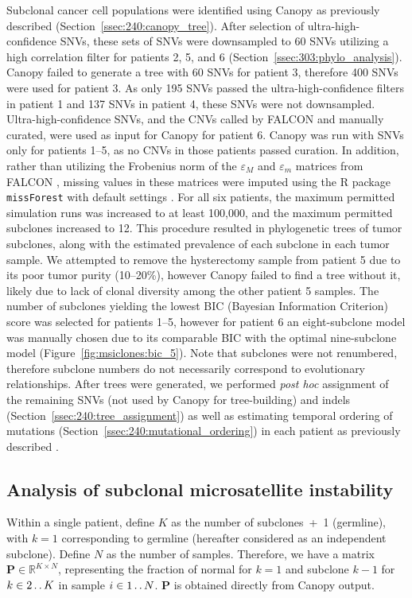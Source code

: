 Subclonal cancer cell populations were identified using Canopy \cite{canopy} as previously described \cite{chen2019} (Section~\ref{ssec:240:canopy_tree}). After selection of ultra-high-confidence SNVs, these sets of SNVs were downsampled to 60 SNVs utilizing a high correlation filter for patients 2, 5, and 6 (Section~\ref{ssec:303:phylo_analysis}). Canopy \cite{canopy} failed to generate a tree with 60 SNVs for patient 3, therefore 400 SNVs were used for patient 3. As only 195 SNVs passed the ultra-high-confidence filters in patient 1 and 137 SNVs in patient 4, these SNVs were not downsampled. Ultra-high-confidence SNVs, and the CNVs called by FALCON \cite{falcon} and manually curated, were used as input for Canopy for patient 6. Canopy was run with SNVs only for patients 1--5, as no CNVs in those patients passed curation. In addition, rather than utilizing the Frobenius norm of the $\varepsilon_M$ and $\varepsilon_m$ matrices from FALCON \cite{falcon}, missing values in these matrices were imputed using the R package \texttt{missForest} with default settings \cite{missForest}. For all six patients, the maximum permitted simulation runs was increased to at least 100,000, and the maximum permitted subclones increased to 12. This procedure resulted in phylogenetic trees of tumor subclones, along with the estimated prevalence of each subclone in each tumor sample. We attempted to remove the hysterectomy sample from patient 5 due to its poor tumor purity (10--20\%), however Canopy failed to find a tree without it, likely due to lack of clonal diversity among the other patient 5 samples. The number of subclones yielding the lowest BIC (Bayesian Information Criterion) score was selected for patients 1--5, however for patient 6 an eight-subclone model was manually chosen due to its comparable BIC with the optimal nine-subclone model (Figure~\ref{fig:msiclones:bic_5}). Note that subclones were not renumbered, therefore subclone numbers do not necessarily correspond to evolutionary relationships. After trees were generated, we performed \textit{post hoc} assignment of the remaining SNVs (not used by Canopy for tree-building) and indels (Section~\ref{ssec:240:tree_assignment}) as well as estimating temporal ordering of mutations (Section~\ref{ssec:240:mutational_ordering}) in each patient as previously described \cite{krook2019_mcs}.

\subsection{Analysis of subclonal microsatellite instability}
\label{ssec:msiclones:subclonal_msi}
Within a single patient, define $K$ as the number of \mbox{subclones + 1} (germline), with $k=1$ corresponding to germline (hereafter considered as an independent subclone). Define $N$ as the number of samples. Therefore, we have a matrix $\mathbf{P} \in \mathbb{R}^{K \times N}$, representing the fraction of normal for $k=1$ and subclone $k-1$ for $k \in 2 \mathinner {\ldotp \ldotp} K$ in sample $i \in 1 \mathinner {\ldotp \ldotp} N$. $\mathbf{P}$ is obtained directly from Canopy output.

